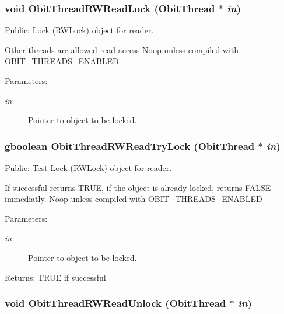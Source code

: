 \subsubsection{\setlength{\rightskip}{0pt plus 5cm}void Obit\-Thread\-RWRead\-Lock ({\bf Obit\-Thread} $\ast$ {\em in})}\label{ObitThread_8c_a10}


Public: Lock (RWLock) object for reader. 

Other threads are allowed read access Noop unless compiled with OBIT\_\-THREADS\_\-ENABLED \begin{Desc}
\item[Parameters:]
\begin{description}
\item[{\em in}]Pointer to object to be locked. \end{description}
\end{Desc}
\subsubsection{\setlength{\rightskip}{0pt plus 5cm}gboolean Obit\-Thread\-RWRead\-Try\-Lock ({\bf Obit\-Thread} $\ast$ {\em in})}\label{ObitThread_8c_a11}


Public: Test Lock (RWLock) object for reader. 

If successful returns TRUE, if the object is already locked, returns FALSE immediatly. Noop unless compiled with OBIT\_\-THREADS\_\-ENABLED \begin{Desc}
\item[Parameters:]
\begin{description}
\item[{\em in}]Pointer to object to be locked. \end{description}
\end{Desc}
\begin{Desc}
\item[Returns:]TRUE if successful \end{Desc}
\subsubsection{\setlength{\rightskip}{0pt plus 5cm}void Obit\-Thread\-RWRead\-Unlock ({\bf Obit\-Thread} $\ast$ {\em in})}\label{ObitThread_8c_a12}


